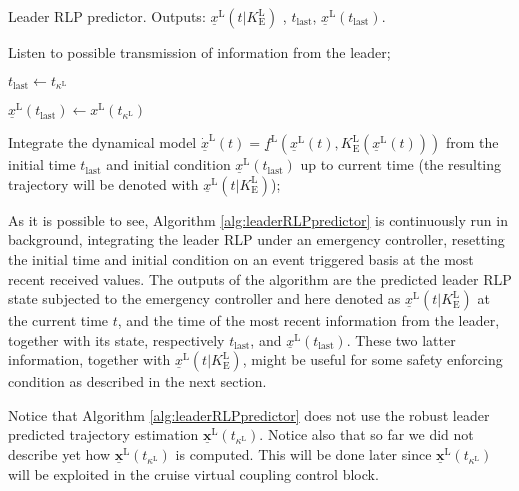 \documentclass[letterpaper, 10 pt, conference]{ieeeconf}
\theoremstyle{definition}
\theoremstyle{nopoint}
\begin{document}
\begin{algorithm}
\caption{Leader RLP predictor. Outputs: $\underline{x}^\mathrm{L}(t|K_\mathrm{E}^\mathrm{L})$ , $t_{\mathrm{last}}$, $\underline{x}^\mathrm{L}(t_{\mathrm{last}})$. }\label{alg:leaderRLPpredictor}
\begin{algorithmic}[1]
\Loop

\State Listen to possible transmission of information from the leader;

 
\State $t_{\mathrm{last}} \leftarrow t_{\kappa^\mathrm{L}}$

\State $\underline{x}^\mathrm{L}(t_{\mathrm{last}}) \leftarrow x^\mathrm{L}(t_{\kappa^\mathrm{L}})$

\EndIf


\State Integrate the dynamical model  $\underline{\dot{x}}^\mathrm{L}(t) = \underline{f}^\mathrm{L}(\underline{x}^\mathrm{L}(t),K_\mathrm{E}^\mathrm{L}(\underline{x}^\mathrm{L}(t)))$ from the initial time $t_{\mathrm{last}}$ and initial condition $\underline{x}^\mathrm{L}(t_{\mathrm{last}})$  up to current time (the resulting trajectory will be denoted
with $\underline{x}^\mathrm{L}(t|K_\mathrm{E}^\mathrm{L})$);



\EndLoop

\end{algorithmic}
\end{algorithm}


As it is possible to see, Algorithm \ref{alg:leaderRLPpredictor} is continuously run in background, integrating the leader RLP under an emergency controller, resetting the initial time and initial condition on an event triggered basis at the most recent received values. 
The outputs of the algorithm are the predicted leader RLP state subjected to the emergency controller and here denoted as $\underline{x}^\mathrm{L}(t|K_\mathrm{E}^\mathrm{L})$ at the current time $t$, and the time of the most recent information from the leader, together with its state, respectively $t_{\mathrm{last}}$, and $\underline{x}^\mathrm{L}(t_{\mathrm{last}})$. These two latter information, together with $\underline{x}^\mathrm{L}(t|K_\mathrm{E}^\mathrm{L})$, might be useful for some safety enforcing condition as described in the next section. 


Notice that Algorithm \ref{alg:leaderRLPpredictor} does not use the robust leader predicted trajectory estimation $\underline{\mathbf{x}}^\mathrm{L}(t_{\kappa^\mathrm{L}})$.
Notice also that so far we did not describe yet how $\underline{\mathbf{x}}^\mathrm{L}(t_{\kappa^\mathrm{L}})$ is computed. This will be done later since $\underline{\mathbf{x}}^\mathrm{L}(t_{\kappa^\mathrm{L}})$ will be exploited in the cruise virtual coupling control block. 
\end{document}
